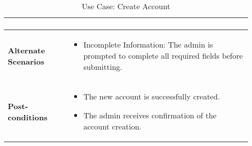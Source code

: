 \begin{table}[!ht]
\begin{tabularx}{\textwidth}{|l|X|}
\begin{enumerate}[label=\arabic*.,itemsep=0pt]
        \end{enumerate} \\
        \hline
        \textbf{Alternate Scenarios} & 
        \begin{itemize}[label=--,itemsep=0pt]
            \item Incomplete Information: The admin is prompted to complete all required fields before submitting.
        \end{itemize} \\
        \hline
        \textbf{Post-conditions} & 
        \begin{itemize}[label=--,itemsep=0pt]
            \item The new account is successfully created.
            \item The admin receives confirmation of the account creation.
        \end{itemize} \\
        \hline
    \end{tabularx}
    \caption{Use Case: Create Account}
    \label{tab:use-case-create-account}
\end{table}


